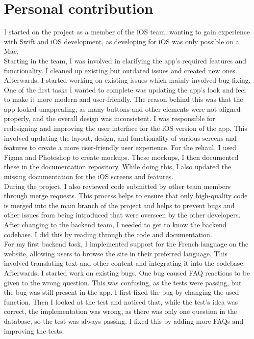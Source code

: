 \documentclass[sf-font,usefira,english]{uulm/sp/article}
\begin{document}
\section{Personal contribution}

I started on the project as a member of the iOS team, wanting to gain experience with Swift and iOS development, as developing for iOS was only possible on a Mac.\\
Starting in the team, I was involved in clarifying the app's required features and functionality. 
I cleaned up existing but outdated issues and created new ones.\\

Afterwards, I started working on existing issues which mainly involved bug fixing.
One of the first tasks I wanted to complete was updating the app's look and feel to make it more modern and user-friendly. 
The reason behind this was that the app looked unappealing, as many buttons and other elements were not aligned properly, and the overall design was inconsistent. 
I was responsible for redesigning and improving the user interface for the iOS version of the app. 
This involved updating the layout, design, and functionality of various screens and features to create a more user-friendly user experience. 
For the rehaul, I used Figma and Photoshop to create mockups. 
These mockups, I then documented these in the documentation repository.
While doing this, I also updated the missing documentation for the iOS screens and features.\\

During the project, I also reviewed code submitted by other team members through merge requests. 
This process helps to ensure that only high-quality code is merged into the main branch of the project and helps to prevent bugs and other issues from being introduced that were overseen by the other developers.\\
After changing to the backend team, I needed to get to know the backend codebase. 
I did this by reading through the code and documentation.\\

For my first backend task, I implemented support for the French language on the website, allowing users to browse the site in their preferred language. 
This involved translating text and other content and integrating it into the codebase.\\

Afterwards, I started work on existing bugs. 
One bug caused FAQ reactions to be given to the wrong question. 
This was confusing, as the tests were passing, but the bug was still present in the app. 
I first fixed the bug by changing the used function. 
Then I looked at the test and noticed that, while the test’s idea was correct, the implementation was wrong, as there was only one question in the database, so the test was always passing. 
I fixed this by adding more FAQs and improving the tests.\\
\end{document}
